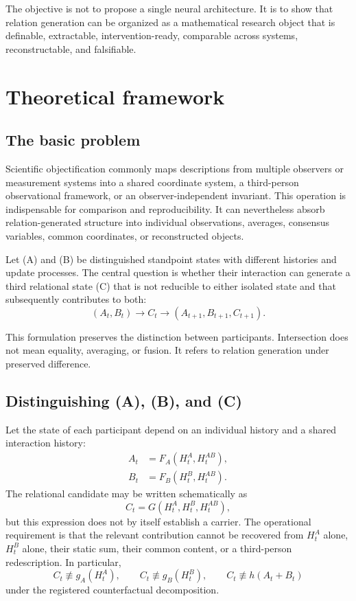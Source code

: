 \documentclass[11pt,a4paper]{article}
\begin{document}
The objective is not to propose a single neural architecture. It is to show that relation generation can be organized as a mathematical research object that is definable, extractable, intervention-ready, comparable across systems, reconstructable, and falsifiable.

\section{Theoretical framework}

\subsection{The basic problem}

Scientific objectification commonly maps descriptions from multiple observers or measurement systems into a shared coordinate system, a third-person observational framework, or an observer-independent invariant. This operation is indispensable for comparison and reproducibility. It can nevertheless absorb relation-generated structure into individual observations, averages, consensus variables, common coordinates, or reconstructed objects.

Let (A) and (B) be distinguished standpoint states with different histories and update processes. The central question is whether their interaction can generate a third relational state (C) that is not reducible to either isolated state and that subsequently contributes to both:
\begin{equation}
  (A_t,B_t) \longrightarrow C_t
  \longrightarrow (A_{t+1},B_{t+1},C_{t+1}).
  \label{eq:closure}
\end{equation}

This formulation preserves the distinction between participants. Intersection does not mean equality, averaging, or fusion. It refers to relation generation under preserved difference.

\subsection{Distinguishing (A), (B), and (C)}

Let the state of each participant depend on an individual history and a shared interaction history:
\begin{align}
 A_t &= F_A(H^A_t,H^{AB}_t),\\
 B_t &= F_B(H^B_t,H^{AB}_t).
\end{align}
The relational candidate may be written schematically as
\begin{equation}
  C_t = G(H^A_t,H^B_t,H^{AB}_t),
\end{equation}
but this expression does not by itself establish a carrier. The operational requirement is that the relevant contribution cannot be recovered from $H^A_t$ alone, $H^B_t$ alone, their static sum, their common content, or a third-person redescription. In particular,
\begin{equation}
 C_t \not\equiv g_A(H^A_t), \qquad
 C_t \not\equiv g_B(H^B_t), \qquad
 C_t \not\equiv h(A_t+B_t)
\end{equation}
under the registered counterfactual decomposition.
\end{document}
